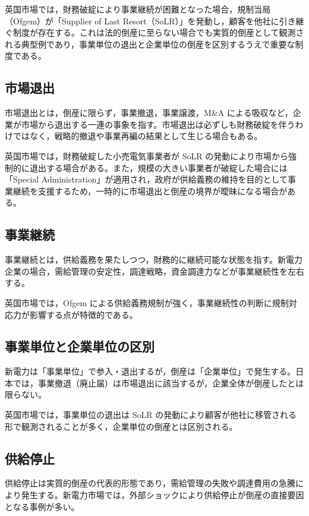 英国市場では，財務破綻により事業継続が困難となった場合，規制当局（Ofgem）が「Supplier of Last Resort（SoLR）」を発動し，顧客を他社に引き継ぐ制度が存在する。これは法的倒産に至らない場合でも実質的倒産として観測される典型例であり，事業単位の退出と企業単位の倒産を区別するうえで重要な制度である。

\subsection{市場退出}

市場退出とは，倒産に限らず，事業撤退，事業譲渡，M\&A による吸収など，企業が市場から退出する一連の事象を指す。市場退出は必ずしも財務破綻を伴うわけではなく，戦略的撤退や事業再編の結果として生じる場合もある。

英国市場では，財務破綻した小売電気事業者が SoLR の発動により市場から強制的に退出する場合がある。また，規模の大きい事業者が破綻した場合には「Special Administration」が適用され，政府が供給義務の維持を目的として事業継続を支援するため，一時的に市場退出と倒産の境界が曖昧になる場合がある。

\subsection{事業継続}

事業継続とは，供給義務を果たしつつ，財務的に継続可能な状態を指す。新電力企業の場合，需給管理の安定性，調達戦略，資金調達力などが事業継続性を左右する。

英国市場では，Ofgem による供給義務規制が強く，事業継続性の判断に規制対応力が影響する点が特徴的である。

\subsection{事業単位と企業単位の区別}

新電力は「事業単位」で参入・退出するが，倒産は「企業単位」で発生する。日本では，事業撤退（廃止届）は市場退出に該当するが，企業全体が倒産したとは限らない。

英国市場では，事業単位の退出は SoLR の発動により顧客が他社に移管される形で観測されることが多く，企業単位の倒産とは区別される。

\subsection{供給停止}

供給停止は実質的倒産の代表的形態であり，需給管理の失敗や調達費用の急騰により発生する。新電力市場では，外部ショックにより供給停止が倒産の直接要因となる事例が多い。

